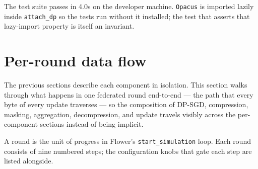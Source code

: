 \documentclass[11pt,a4paper]{report}
\begin{document}
The test suite passes in 4.0s on the developer machine. \texttt{Opacus} is
imported lazily inside \texttt{attach\_dp} so the tests run without it
installed; the test that asserts that lazy-import property is itself an
invariant.

\section{Per-round data flow}\label{sec:dataflow}

The previous sections describe each component in isolation. This section
walks through what happens in one federated round end-to-end --- the path
that every byte of every update traverses --- so the composition of
DP-SGD, compression, masking, aggregation, decompression, and update
travels visibly across the per-component sections instead of being
implicit.

A round is the unit of progress in Flower's
\texttt{start\_simulation} loop. Each round consists of nine numbered
steps; the configuration knobs that gate each step are listed alongside.
\end{document}
